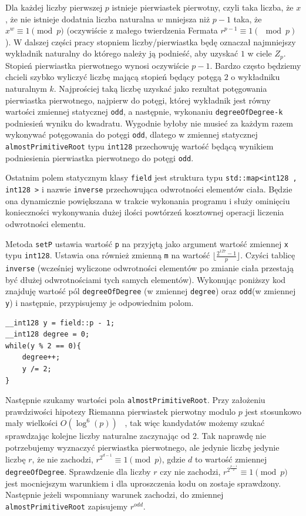 \documentclass{article}
\begin{document}
Dla każdej liczby pierwszej $p$ istnieje pierwiastek pierwotny, czyli taka liczba, że $x$, że nie istnieje 
dodatnia liczba naturalna $w$ mniejsza niż $p-1$ taka, że $x^w \equiv 1 \pmod p$ (oczywiście z małego twierdzenia
Fermata $r^{p-1} \equiv 1 (\mod p)$). W dalszej części pracy stopniem liczby/pierwiastka będę oznaczał najmniejszy wykładnik
naturalny do którego należy ją podnieść, aby uzyskać $1$ w ciele $Z_p$. Stopień pierwiastka pierwotnego wynosi 
oczywiście $p-1$. Bardzo często będziemy chcieli szybko wyliczyć liczbę mającą stopień będący potęgą $2$ o 
wykładniku naturalnym $k$. Najprościej taką liczbę uzyskać jako rezultat potęgowania pierwiastka pierwotnego,
najpierw do potęgi, której wykładnik jest równy wartości zmiennej statycznej \texttt{odd}, a następnie,
wykonaniu \texttt{degreeOfDegree-k}  podniesień wyniku do kwadratu. Wygodnie byłoby nie musieć za każdym razem
wykonywać potęgowania do potęgi \texttt{odd}, dlatego w zmiennej statycznej \texttt{almostPrimitiveRoot}
typu \texttt{\textunderscore \textunderscore int128} przechowuję wartość będącą wynikiem podniesienia pierwiastka
pierwotnego do potęgi \texttt{odd}.

Ostatnim polem statycznym klasy \texttt{field} jest struktura typu 
\texttt{std::map<\textunderscore \textunderscore int128 , \textunderscore \textunderscore int128 >} i nazwie 
\texttt{inverse} przechowująca odwrotności elementów ciała. Będzie ona dynamicznie powiększana w trakcie wykonania 
programu i służy ominięciu konieczności wykonywania dużej ilości powtórzeń kosztownej operacji liczenia odwrotności
elementu. 



Metoda \texttt{setP} ustawia wartość 
\texttt{p} na przyjętą jako argument wartość zmiennej \texttt{x} typu 
\texttt{\textunderscore \textunderscore int128}. 
Ustawia ona również zmienną \texttt{m} na wartość $\lfloor \frac{2^{127}-1}{p} \rfloor$.
Czyści tablicę \texttt{inverse} (wcześniej wyliczone odwrotności elementów
po zmianie ciała przestają być dłużej odwrotnościami tych samych elementów).
Wykonując poniższy kod znajduję wartość pól \texttt{degreeOfDegree} (w zmiennej \texttt{degree}) oraz 
\texttt{odd}(w zmiennej \texttt{y}) i następnie, przypisujemy je odpowiednim polom.
\begin{lstlisting}
__int128 y = field::p - 1;
__int128 degree = 0;
while(y % 2 == 0){
    degree++;
    y /= 2;
}
\end{lstlisting}

Następnie szukamy wartości pola \texttt{almostPrimitiveRoot}. 
Przy założeniu prawdziwości hipotezy Riemanna pierwiastek pierwotny modulo $p$ jest
stosunkowo mały wielkości $O(\log^6(p))$ ~\cite{durnoga2017large}, 
tak więc kandydatów możemy szukać sprawdzając kolejne liczby naturalne zaczynając od 2. 
Tak naprawdę nie potrzebujemy wyznaczyć pierwiastka pierwotnego, ale jedynie liczbę jedynie liczbę 
$r$, że nie zachodzi, $r^{2^{d-1}} \equiv 1 \pmod p$, gdzie $d$ to wartość zmiennej \texttt{degreeOfDegree}. Sprawdzenie dla liczby $r$ czy nie zachodzi, 
$r^{2^\frac{p-1}{2}} \equiv 1 \pmod p$ jest mocniejszym warunkiem i dla uproszczenia kodu on zostaje sprawdzony. Następnie
jeżeli wspomniany warunek zachodzi, do zmiennej \texttt{almostPrimitiveRoot} zapisujemy $r^{odd}$.
\end{document}
